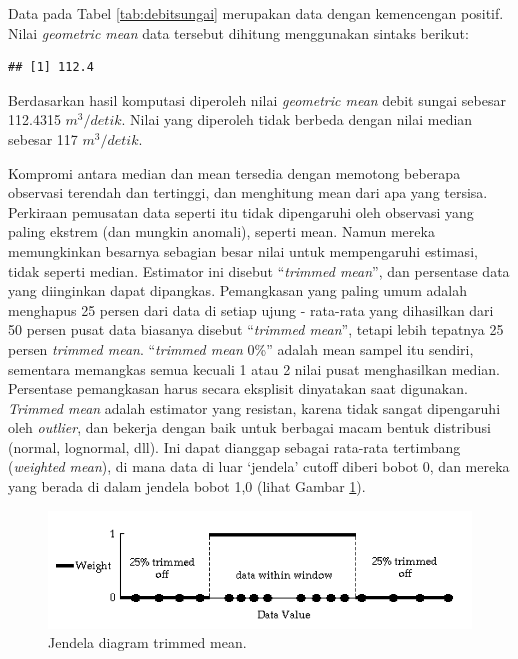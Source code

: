 \documentclass[]{book}
\newenvironment{Shaded}{\begin{snugshade}}{\end{snugshade}}
\newcommand{\KeywordTok}[1]{\textcolor[rgb]{0.13,0.29,0.53}{\textbf{#1}}}
\newcommand{\OperatorTok}[1]{\textcolor[rgb]{0.81,0.36,0.00}{\textbf{#1}}}
\newcommand{\NormalTok}[1]{#1}
\begin{document}
Data pada Tabel \ref{tab:debitsungai} merupakan data dengan kemencengan
positif. Nilai \emph{geometric mean} data tersebut dihitung menggunakan
sintaks berikut:

\begin{Shaded}
\end{Shaded}

\begin{verbatim}
## [1] 112.4
\end{verbatim}

Berdasarkan hasil komputasi diperoleh nilai \emph{geometric mean} debit
sungai sebesar 112.4315 \(m^3/detik\). Nilai yang diperoleh tidak
berbeda dengan nilai median sebesar 117 \(m^3/detik\).

Kompromi antara median dan mean tersedia dengan memotong beberapa
observasi terendah dan tertinggi, dan menghitung mean dari apa yang
tersisa. Perkiraan pemusatan data seperti itu tidak dipengaruhi oleh
observasi yang paling ekstrem (dan mungkin anomali), seperti mean. Namun
mereka memungkinkan besarnya sebagian besar nilai untuk mempengaruhi
estimasi, tidak seperti median. Estimator ini disebut ``\emph{trimmed
mean}'', dan persentase data yang diinginkan dapat dipangkas.
Pemangkasan yang paling umum adalah menghapus 25 persen dari data di
setiap ujung - rata-rata yang dihasilkan dari 50 persen pusat data
biasanya disebut ``\emph{trimmed mean}'', tetapi lebih tepatnya 25
persen \emph{trimmed mean}. ``\emph{trimmed mean} 0\%'' adalah mean
sampel itu sendiri, sementara memangkas semua kecuali 1 atau 2 nilai
pusat menghasilkan median. Persentase pemangkasan harus secara eksplisit
dinyatakan saat digunakan. \emph{Trimmed mean} adalah estimator yang
resistan, karena tidak sangat dipengaruhi oleh \emph{outlier}, dan
bekerja dengan baik untuk berbagai macam bentuk distribusi (normal,
lognormal, dll). Ini dapat dianggap sebagai rata-rata tertimbang
(\emph{weighted mean}), di mana data di luar `jendela' cutoff diberi
bobot 0, dan mereka yang berada di dalam jendela bobot 1,0 (lihat Gambar
\ref{fig:tm}).

\begin{figure}

{\centering \includegraphics[width=0.7\linewidth]{tm} 

}

\caption{Jendela diagram trimmed mean.}\label{fig:tm}
\end{figure}
\end{document}
